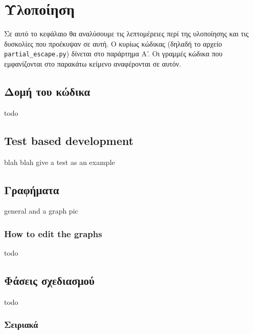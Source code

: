 
\chapter{Υλοποίηση}
\label{chapter4}

Σε αυτό το κεφάλαιο θα αναλύσουμε τις λεπτομέρειες περί της υλοποίησης και τις
δυσκολίες που προέκυψαν σε αυτή. Ο κυρίως κώδικας (δηλαδή το αρχείο
\texttt{partial\_escape.py}) δίνεται στο παράρτημα Α'. Οι γραμμές κώδικα που
εμφανίζονται στο παρακάτω κείμενο αναφέρονται σε αυτόν.

\section{Δομή του κώδικα}

todo


\section{Test based development}

blah blah give a test as an example



\section{Γραφήματα}

general and a graph pic

\subsection{How to edit the graphs}

todo


\section{Φάσεις σχεδιασμού}

todo

\subsection{Σειριακά}
